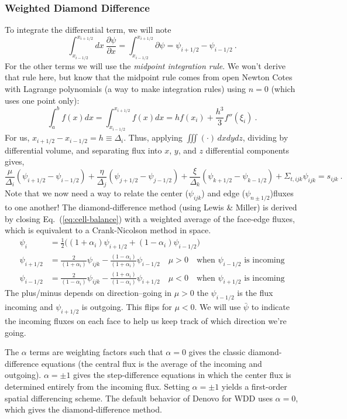 \documentclass[12pt]{article}
\newcommand{\Di}{\ensuremath{\Delta_i}}
\newcommand{\Dj}{\ensuremath{\Delta_j}}
\newcommand{\Dk}{\ensuremath{\Delta_k}}
\begin{document}
\subsubsection*{Weighted Diamond Difference}
To integrate the differential term, we will note
\[
\int_{x_{i-1/2}}^{x_{i+1/2}} dx \:\frac{\partial \psi}{\partial x}  = \int_{x_{i-1/2}}^{x_{i+1/2}} \partial \psi = \psi_{i+1/2} - \psi_{i-1/2} \:.
\]
For the other terms we will use the \textit{midpoint integration rule}. We won't derive that rule here, but know that the midpoint rule comes from open Newton Cotes with Lagrange polynomials (a way to make integration rules) using $n=0$ (which uses one point only):
\[\int_a^b f(x)dx = \int_{x_{i-1/2}}^{x_{i+1/2}} f(x)dx = hf(x_i) + \frac{h^3}{3}f''(\xi_i)\:.\]
For us, $x_{i+1/2} - x_{i-1/2} = h \equiv \Di$. Thus, applying $\iiint(\cdot)\,dxdydz$, dividing by differential volume, and separating flux into $x$, $y$, and $z$ differential components gives,
\begin{equation}
  \frac{\mu}{\Delta_i}(\psi_{i+1/2}-\psi_{i-1/2}) +
  \frac{\eta}{\Dj}(\psi_{j+1/2}-\psi_{j-1/2}) +
  \frac{\xi}{\Dk}(\psi_{k+1/2}-\psi_{k-1/2}) + \Sigma_{t,ijk}\psi_{ijk} = s_{ijk}\:.
  \label{eq:cell-balance}
\end{equation}
Note that we now need a way to relate the center ($\psi_{ijk}$) and edge ($\psi_{n\pm 1/2}$)fluxes to one another!
The diamond-difference method (using Lewis \& Miller) is derived by closing
Eq.~(\ref{eq:cell-balance}) with a weighted average of the face-edge fluxes, which is
equivalent to a Crank-Nicolson method in space. 
\begin{align*}
\psi_{i} &= \frac{1}{2}\bigl((1+\alpha_i)\psi_{i+1/2}+(1-\alpha_i)\psi_{i-1/2}\bigr)\\
\psi_{i+1/2} &= \frac{2}{(1+\alpha_i)}\psi_{ijk}-
    \frac{(1-\alpha_i)}{(1+\alpha_i)}\psi_{i-1/2}\quad \mu>0 \quad \text{when }\psi_{i-1/2}\text{ is incoming}\\
\psi_{i-1/2} &= \frac{2}{(1-\alpha_i)}\psi_{ijk}-
    \frac{(1+\alpha_i)}{(1-\alpha_i)}\psi_{i+1/2}\quad \mu<0 \quad \text{when }\psi_{i+1/2}\text{ is incoming}
\end{align*}
The plus/minus depends on direction--going in $\mu>0$ the $\psi_{i-1/2}$ is the flux incoming and $\psi_{i+1/2}$ is outgoing. This flips for $\mu<0$. We will use $\bar{\psi}$ to indicate the incoming fluxes on each face to help us keep track of which direction we're going.

The $\alpha$
terms are weighting factors such that $\alpha=0$ gives the classic
diamond-difference equations (the central flux is the average of the incoming and outgoing). $\alpha = \pm 1$ gives the step-difference
equations in which the center flux is determined entirely from the incoming flux.  Setting $\alpha = \pm 1$ yields a first-order spatial differencing
scheme.  The default behavior of Denovo for WDD uses $\alpha=0$, which gives
the diamond-difference method.
\end{document}
